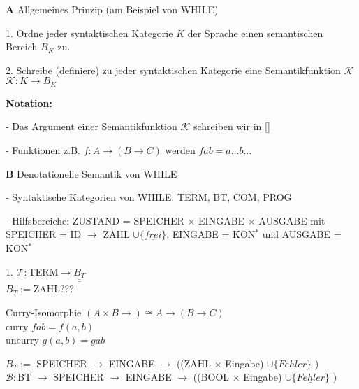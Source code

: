 \begin{compactitem}
	\item[\textbf{A}] Allgemeines Prinzip (am Beispiel von WHILE)\\
	\begin{compactitem}
		\item[1.] Ordne jeder syntaktischen Kategorie $K$ der Sprache einen semantischen Bereich $B_K$ zu.
		\item[2.] Schreibe (definiere) zu jeder syntaktischen Kategorie eine Semantikfunktion $\mathcal{K}$\\
		$\mathcal{K}:K \rightarrow B_K$
	\end{compactitem}
	\textbf{Notation:}
	\begin{compactitem}
		\item[-] Das Argument einer Semantikfunktion $\mathcal{K}$ schreiben wir in []
		\item[-] Funktionen z.B. $f: A \rightarrow (B \rightarrow C)$ werden $f a b = a \dots b \dots $ 
	\end{compactitem}
	\item[\textbf{B}] Denotationelle Semantik von WHILE
	\begin{compactitem}
		\item[-] Syntaktische Kategorien von WHILE: TERM, BT, COM, PROG
		\item[-] Hilfsbereiche: ZUSTAND = SPEICHER $\times$ EINGABE $\times$ AUSGABE mit SPEICHER = ID $\rightarrow$ ZAHL $\cup \{\underline{frei}\}$, EINGABE = KON$^*$ und AUSGABE = KON$^*$
		\item[1.] $\mathcal{T}:$TERM$\rightarrow \underline{\underline{B_T}}$\\
		$B_T :=$ZAHL???
		\begin{compactitem}
			\item[Curry-Isomorphie] $(A \times B \rightarrow) \cong A \rightarrow (B \rightarrow C)$\\
			curry $f a b = f(a,b)$\\
			uncurry $g (a,b) = g a b$
		\end{compactitem}
		$B_T := $ SPEICHER $\rightarrow$ EINGABE $\rightarrow$ ((ZAHL $\times$ Eingabe) $\cup \{\underline{Fehler} \}$ )\\
		$\mathcal{B}:$BT $\rightarrow $ SPEICHER $\rightarrow$ EINGABE $\rightarrow$ ((BOOL $\times$ Eingabe) $\cup \{\underline{Fehler} \}$ )\\

\end{compactitem}
\end{compactitem}
